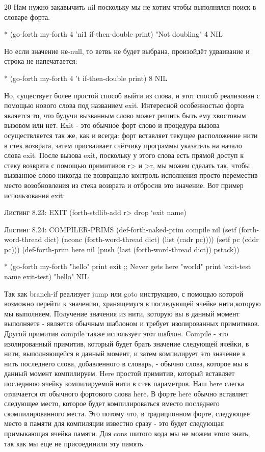 {{{20 Нам нужно закавычить nil поскольку мы не хотим чтобы выполнялся поиск в словаре форта.

* (go-forth my-forth
4 ’ni1 if-then-double print)
"Not doubling"
4
NIL

Но если значение не-null, то ветвь не будет выбрана, произойдёт удваивание и строка не напечатается:

* (go-forth my-forth
4 ’t if-then-double print)
8
NIL

Но, существует более простой способ выйти из слова, и этот способ реализован с помощью нового слова под названием exit. Интересной особенностью форта является то, что будучи вызванным слово может решить быть ему хвостовым вызовом или нет. Exit - это обычное форт слово и процедура вызова осуществляется так же, как и всегда: форт вставляет текущее расположение нити в стек возврата, затем присваивает счётчику программы указатель на начало слова exit. После вызова exit, поскольку у этого слова есть прямой доступ к стеку возврата с помощью примитивов r> и >r, мы можем сделать так, чтобы вызванное слово никогда не возвращало контроль исполнения просто переместив место возобновления из стека возврата и отбросив это значение. Вот пример использования exit:

Листинг 8.23: EXIT
(forth-stdlib-add
{ r> drop } ‘exit name)

Листинг 8.24: COMPILER-PRIMS
(def-forth-naked-prim compile nil
(setf (forth-word-thread dict)
(nconc (forth-word-thread dict)
(list (cadr pc))))
(setf pc (cddr pc)))
(def-forth-prim here nil
(push (last (forth-word-thread dict))
pstack))

* (go-forth my-forth
{ "hello" print
exit
;; Never gets here
"world" print } ‘exit-test name
exit-test)
"hello"
NIL

Так как branch-if реализует jump или goto инструкцию, с помощью которой возможно перейти к значению, хранящемуся в последующей ячейке нити,которую мы выполняем. Получение значения из нити, которую вы в данный момент выполняете - является обычным шаблоном и требует изолированных примитивов. Другой примитив compile также использует этот шаблон. Compile - это изолированный примитив, который будет брать значение следующей ячейки, в нити, выполняющейся в данный момент, и затем компилирует это значение в нить последнего слова, добавленного в словарь, - обычно слова, которое мы в данный момент компилируем. Here простой примитив, который вставляет последнюю ячейку компилируемой нити в стек параметров. Наш here слегка отличается от обычного фортового слова here. В форте here обычно вставляет следующее место, которое будет компилироваться вместо последнего скомпилированного места. Это потому что, в традиционном форте, следующее место в памяти для компиляции известно сразу - это будет следующая примыкающая ячейка памяти. Для cons шитого кода мы не можем этого знать, так как мы еще не присоединили эту память.

}}}
